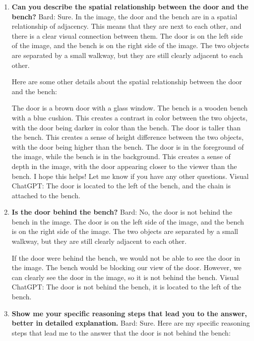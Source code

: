     \begin{enumerate}
        \item \textbf{Can you describe the spatial relationship between the door and the bench?}
        \subitem Bard: Sure. In the image, the door and the bench are in a spatial relationship of adjacency. This means that they are next to each other, and there is a clear visual connection between them. The door is on the left side of the image, and the bench is on the right side of the image. The two objects are separated by a small walkway, but they are still clearly adjacent to each other.

        Here are some other details about the spatial relationship between the door and the bench:
        
        The door is a brown door with a glass window. The bench is a wooden bench with a blue cushion. This creates a contrast in color between the two objects, with the door being darker in color than the bench.
        The door is taller than the bench. This creates a sense of height difference between the two objects, with the door being higher than the bench.
        The door is in the foreground of the image, while the bench is in the background. This creates a sense of depth in the image, with the door appearing closer to the viewer than the bench.
        I hope this helps! Let me know if you have any other questions.
        \subitem Visual ChatGPT: The door is located to the left of the bench, and the chain is attached to the bench.
        \item \textbf{Is the door behind the bench?}
        \subitem Bard: No, the door is not behind the bench in the image. The door is on the left side of the image, and the bench is on the right side of the image. The two objects are separated by a small walkway, but they are still clearly adjacent to each other.

        If the door were behind the bench, we would not be able to see the door in the image. The bench would be blocking our view of the door. However, we can clearly see the door in the image, so it is not behind the bench.
        \subitem Visual ChatGPT: The door is not behind the bench, it is located to the left of the bench.
        \item \textbf{Show me your specific reasoning steps that lead you to the answer, better in detailed explanation.}
        \subitem Bard: Sure. Here are my specific reasoning steps that lead me to the answer that the door is not behind the bench:


\end{enumerate}
